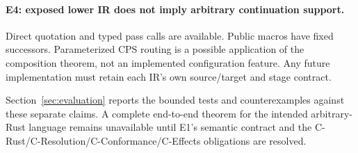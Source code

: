 \paragraph{E4: exposed lower IR does not imply arbitrary continuation support.}
Direct quotation and typed pass calls are available. Public macros have fixed
successors. Parameterized CPS routing is a possible application of the
composition theorem, not an implemented configuration feature. Any future
implementation must retain each IR's own source/target and stage contract.

Section~\ref{sec:evaluation} reports the bounded tests and counterexamples
against these separate claims. A complete end-to-end theorem for the intended
arbitrary-Rust language remains unavailable until E1's semantic contract and
the C-Rust/C-Resolution/C-Conformance/C-Effects obligations are resolved.
